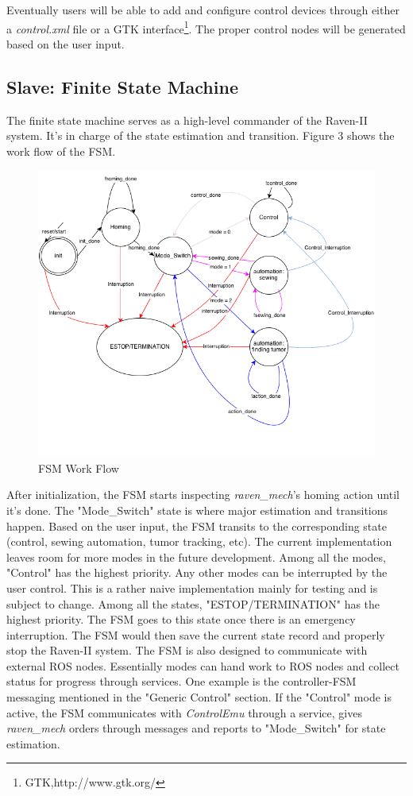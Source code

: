\documentclass[letterpaper,twocolumn,10pt]{article}
\begin{document}
Eventually users will be able to add and configure control devices
through either a {\it control.xml} file or a GTK
interface\footnote{GTK,http://www.gtk.org/}. The proper control nodes
will be generated based on the user input.

\subsection{Slave: Finite State Machine}

The finite state machine serves as a high-level commander of the
Raven-II system. It's in charge of the state estimation and
transition. Figure 3 shows the work flow of the FSM.

\begin{figure}[h]
\includegraphics[scale=0.4]{FSM.png}
\caption{FSM Work Flow}
\end{figure}

After initialization, the FSM starts inspecting {\it raven\_mech}'s
homing action until it's done. The "Mode\_Switch" state is where major
estimation and transitions happen. Based on the user input, the FSM
transits to the corresponding state (control, sewing automation, tumor
tracking, etc). The current implementation leaves room for more modes
in the future development. Among all the modes, "Control" has the
highest priority. Any other modes can be interrupted by the user
control. This is a rather naive implementation mainly for testing and
is subject to change. Among all the states, "ESTOP/TERMINATION" has
the highest priority. The FSM goes to this state once there is an
emergency interruption. The FSM would then save the current state
record and properly stop the Raven-II system. The FSM is also designed
to communicate with external ROS nodes. Essentially modes can hand
work to ROS nodes and collect status for progress through
services. One example is the controller-FSM messaging mentioned in the
"Generic Control" section. If the "Control" mode is active, the FSM
communicates with {\it ControlEmu} through a service, gives {\it
  raven\_mech} orders through messages and reports to "Mode\_Switch"
for state estimation.
\end{document}
